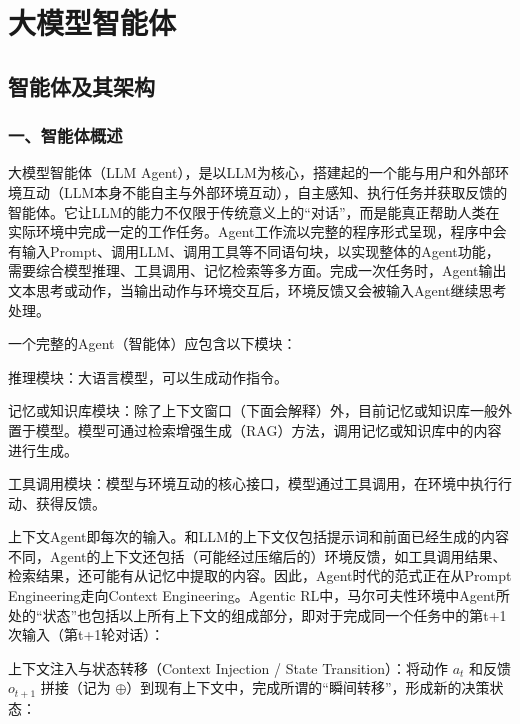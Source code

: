 \hypertarget{ux5927ux6a21ux578bux667aux80fdux4f53}{%
\chapter{大模型智能体}\label{ux5927ux6a21ux578bux667aux80fdux4f53}}

\hypertarget{ux667aux80fdux4f53ux53caux5176ux67b6ux6784}{%
\section{智能体及其架构}\label{ux667aux80fdux4f53ux53caux5176ux67b6ux6784}}

\hypertarget{ux4e00ux667aux80fdux4f53ux6982ux8ff0}{%
\subsection{一、智能体概述}\label{ux4e00ux667aux80fdux4f53ux6982ux8ff0}}

大模型智能体（LLM Agent），是以LLM为核心，搭建起的一个能与用户和外部环境互动（LLM本身不能自主与外部环境互动），自主感知、执行任务并获取反馈的智能体。它让LLM的能力不仅限于传统意义上的``对话''，而是能真正帮助人类在实际环境中完成一定的工作任务。Agent工作流以完整的程序形式呈现，程序中会有输入Prompt、调用LLM、调用工具等不同语句块，以实现整体的Agent功能，需要综合模型推理、工具调用、记忆检索等多方面。完成一次任务时，Agent输出文本思考或动作，当输出动作与环境交互后，环境反馈又会被输入Agent继续思考处理。

一个完整的Agent（智能体）应包含以下模块：

推理模块：大语言模型，可以生成动作指令。

记忆或知识库模块：除了上下文窗口（下面会解释）外，目前记忆或知识库一般外置于模型。模型可通过检索增强生成（RAG）方法，调用记忆或知识库中的内容进行生成。

工具调用模块：模型与环境互动的核心接口，模型通过工具调用，在环境中执行行动、获得反馈。

上下文Agent即每次的输入。和LLM的上下文仅包括提示词和前面已经生成的内容不同，Agent的上下文还包括（可能经过压缩后的）环境反馈，如工具调用结果、检索结果，还可能有从记忆中提取的内容。因此，Agent时代的范式正在从Prompt Engineering走向Context Engineering。Agentic RL中，马尔可夫性环境中Agent所处的``状态''也包括以上所有上下文的组成部分，即对于完成同一个任务中的第t+1次输入（第t+1轮对话）：

上下文注入与状态转移（Context Injection / State Transition）：将动作 \(a_t\) 和反馈 \(o_{t+1}\) 拼接（记为 \(\oplus\)）到现有上下文中，完成所谓的``瞬间转移''，形成新的决策状态：

